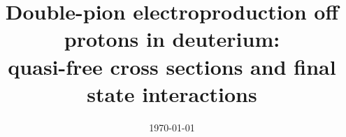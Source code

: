 \documentclass[prc,twocolumn,superscriptaddress,showpacs,amssymb,amsmath,amsfonts,aps,nofootinbib]{revtex4-1}
\begin{document}

\date{\today}
\title{\large Double-pion electroproduction off protons in deuterium: \\quasi-free cross sections and final state interactions \\}




\end{document}
